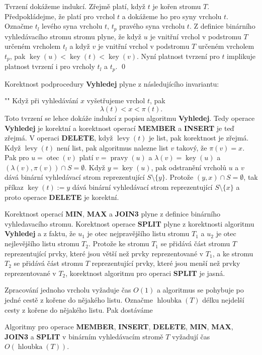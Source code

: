 \documentclass[a4paper,12pt]{article}
\DeclareMathOperator*{\otec}{otec}
\DeclareMathOperator*{\levy}{levy}
\DeclareMathOperator*{\pravy}{pravy}
\DeclareMathOperator*{\key}{key}
\DeclareMathOperator*{\hloubka}{hloubka}
\begin{document}
Tvrzení dokážeme indukcí.  Zřejmě platí, 
když $t$ je kořen stromu $T$.  Předpokládej\-me, že platí pro vrchol 
$t$ a doká\-že\-me ho pro syny vrcholu $t$.  Označme $t_l$ levého syna 
vrcholu $t$, $t_p$ pravého syna vrcholu $t$.  Z definice binárního 
vyhledávacího stromu stromu plyne, že když $u$ je vnitřní 
vrchol v podstromu $T$ určeném vrcholem $t_l$ a když $v$ je vnitřní 
vrchol v podstromu $T$ určeném vrcholem $t_p$, pak 
$\key(u)<\key(t)<\key(v)$.  Nyní platnost tvrzení pro $t$ 
implikuje platnost tvrzení i pro vrcholy $t_l$ a $t_p$.  \qed
\enddemo

Korektnost podprocedury {\bf Vyhledej} plyne z 
následujícího invariantu:
\roster
\item"{}"
Když při vyhledávání $x$ vyšetřujeme vrchol $
t$, pak 
$$\lambda (t)<x<\pi (t).$$
\endroster
Toto tvrzení se lehce dokáže indukcí z popisu algoritmu 
{\bf Vy\-hledej}.  Tedy operace {\bf Vy\-hledej} je korektní a korekt\-nost 
ope\-rací {\bf MEMBER} a {\bf INSERT} je teď zřejmá. V operaci {\bf DELE\-TE},  
když $\levy(t)$ je list, pak korektnost je zřejmá. Když $\levy
(t)$ 
není list, pak algoritmus nalezne list $v$ takový, že $\pi(v)=x$. 
Pak pro $u=\otec(v)$ platí $v=\pravy(u)$ a $\lambda(v)=\key(u)$ a 
$(\lambda(v),\pi(v))\cap S=\emptyset$. Když $y=\key(u)$, pak 
odstranění vrcholů $u$ a $v$ dává binární vyhledávací strom reprezentující $S\setminus \{y\}$. 
Protože $(y,x)\cap S=\emptyset$, tak příkaz $\key(t):=y$ dává binární 
vyhledávací strom reprezentující $S\setminus \{x\}$ a proto operace 
{\bf DELETE} je korektní. 

Korektnost operací {\bf MIN}, {\bf MAX} a {\bf JOIN3} plyne z definice 
binárního vyhledavacího stromu.  Korektnost operace {\bf SPLIT }
plyne z korektnosti algoritmu {\bf Vyhledej} a z faktu, že $u_
1$ je otec 
nej\-pravějšího listu stromu $T_1$ a $u_2$ je otec nejlevějšího listu stromu $T_2$.  
Protože ke stromu $T_1$ se přidává část stromu $T$ reprezentující 
prvky, které jsou větší než prvky reprezentované v $
T_1$, a ke 
stromu $T_2$ se přidává část stromu $T$ reprezentující prvky, 
které jsou menší než prvky reprezentované v $T_2$, korektnost 
algoritmu pro operaci {\bf SPLIT} je jasná.  

Zpracování jednoho vrcholu vyžaduje čas $O(
1)$ a 
algoritmus se pohybuje po jedné cestě z kořene do 
nějakého listu. Označme $\hloubka(T)$ délku nejdelší cesty 
z kořene do nějakého listu. Pak dostáváme

Algoritmy pro operace {\bf MEMBER}, {\bf INSERT}, {\bf DE\-LE\-TE}, {\bf MIN}, {\bf MAX}, 
{\bf JOIN3} a {\bf SPLIT} v binár\-ním vy\-hledá\-va\-cím stro\-mě $
T$ vyžadují 
čas $O(\hloubka(T))$. 
\endproclaim
\end{document}
